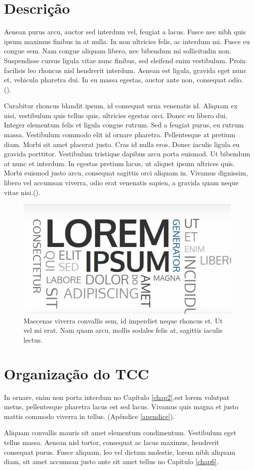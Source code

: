 \section{Descrição}

Aenean purus arcu, auctor sed interdum vel, feugiat a lacus. Fusce nec nibh quis ipsum maximus finibus in at nulla. In non ultricies felis, ac interdum mi. Fusce eu congue sem. Nam congue aliquam libero, nec bibendum mi sollicitudin non. Suspendisse cursus ligula vitae nunc finibus, sed eleifend enim vestibulum. Proin facilisis leo rhoncus nisl hendrerit interdum. Aenean est ligula, gravida eget nunc et, vehicula pharetra dui. In eu massa egestas, auctor ante non, consequat odio. (\cite{alvim2007}).

Curabitur rhoncus blandit ipsum, id consequat urna venenatis id. Aliquam ex nisi, vestibulum quis tellus quis, ultricies egestas orci. Donec eu libero dui. Integer elementum felis et ligula congue rutrum. Sed a feugiat purus, eu rutrum massa. Vestibulum commodo elit id ornare pharetra. Pellentesque at pretium diam. Morbi sit amet placerat justo. Cras id nulla eros. Donec iaculis ligula eu gravida porttitor. Vestibulum tristique dapibus arcu porta euismod. Ut bibendum at nunc et interdum. In egestas pretium lacus, ut aliquet ipsum ultrices quis. Morbi euismod justo arcu, consequat sagittis orci aliquam in. Vivamus dignissim, libero vel accumsan viverra, odio erat venenatis sapien, a gravida quam neque vitae nisi.(\cite{mme2020}). 

\begin{figure}[H]
    \centering
    \includegraphics[width=0.5\linewidth]{Imagens/chap01/loren-ipsum-cover.jpg}
    \caption{Maecenas viverra convallis sem, id imperdiet neque rhoncus et. Ut vel mi erat. Nam quam arcu, mollis sodales felis at, sagittis iaculis lectus.}
    \label{fig:lorem_ipsum}
\end{figure}

\section{Organização do TCC}

In ornare, enim non porta interdum no Capítulo \ref{chap2},est lorem volutpat metus, pellentesque pharetra lacus est sed lacus. Vivamus quis magna et justo mattis commodo viverra in tellus. (Apêndice \ref{apendice}).

Aliquam convallis mauris sit amet elementum condimentum. Vestibulum eget tellus massa. Aenean nisl tortor, consequat ac lacus maximus, hendrerit consequat purus. Fusce aliquam, leo vel dictum molestie, lorem nibh aliquam diam, sit amet accumsan justo ante sit amet tellus no Capítulo \ref{chap6}.
